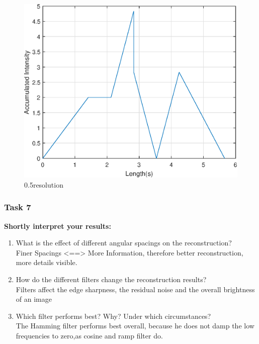 \begin{figure}[htb!]
  \centering
  \includegraphics[width=\linewidth]{homework1/img/1.eps}
  \caption{0.5\textdegree resolution}
  \label{fig:recon_10deg}
\end{figure}

\clearpage
\newpage


\subsubsection*{Task 7}

\textbf{Shortly interpret your results:}
\begin{enumerate}[label=(\alph*)]

\item What is the effect of different angular spacings on the reconstruction?\\
Finer Spacings <==> More Information, therefore better reconstruction, more details visible.

\item How do the different filters change the reconstruction results?\\
Filters affect the edge sharpness, the residual noise and the overall brightness of an image

\item Which filter performs best? Why? Under which circumstances?\\
The Hamming filter performs best overall, because he does not damp the low frequencies to zero,as cosine and ramp filter do.
\end{enumerate}

